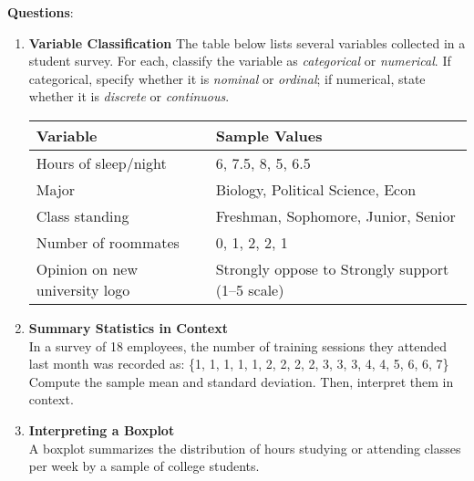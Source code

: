 \documentclass{article}
\begin{document}
\textbf{Questions}:
\begin{enumerate}
    \item \textbf{Variable Classification}  
    The table below lists several variables collected in a student survey. For each, classify the variable as \emph{categorical} or \emph{numerical}. If categorical, specify whether it is \emph{nominal} or \emph{ordinal}; if numerical, state whether it is \emph{discrete} or \emph{continuous}.

    \begin{center}
    \begin{tabular}{|l|l|}
    \hline
    \textbf{Variable} & \textbf{Sample Values} \\
    \hline
    Hours of sleep/night & 6, 7.5, 8, 5, 6.5 \\
    Major & Biology, Political Science, Econ \\
    Class standing & Freshman, Sophomore, Junior, Senior \\
    Number of roommates & 0, 1, 2, 2, 1 \\
    Opinion on new university logo & Strongly oppose to Strongly support (1--5 scale) \\
    \hline
    \end{tabular}
    \end{center}

    \item \textbf{Summary Statistics in Context} \\
    In a survey of 18 employees, the number of training sessions they attended last month was recorded as:
    \{1, 1, 1, 1, 1, 2, 2, 2, 2, 3, 3, 3, 4, 4, 5, 6, 6, 7\} \\
    Compute the sample mean and standard deviation. Then, interpret them in context.

    \item \textbf{Interpreting a Boxplot} \\
    A boxplot summarizes the distribution of hours studying or attending classes per week by a sample of college students.

\begin{center}
\end{center}
\end{enumerate}
\end{document}
